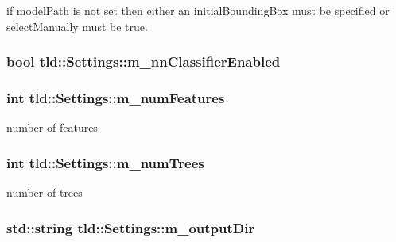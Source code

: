if modelPath is not set then either an initialBoundingBox must be specified or selectManually must be true. 

\hypertarget{classtld_1_1_settings_a8ec793b6668a626308d8ee8d697d9f67}{
\subsubsection[{m\_\-nnClassifierEnabled}]{\setlength{\rightskip}{0pt plus 5cm}bool {\bf tld::Settings::m\_\-nnClassifierEnabled}}}
\label{classtld_1_1_settings_a8ec793b6668a626308d8ee8d697d9f67}
\hypertarget{classtld_1_1_settings_af15afe9f4ffb32e89686c8e90026e2bc}{
\subsubsection[{m\_\-numFeatures}]{\setlength{\rightskip}{0pt plus 5cm}int {\bf tld::Settings::m\_\-numFeatures}}}
\label{classtld_1_1_settings_af15afe9f4ffb32e89686c8e90026e2bc}


number of features 

\hypertarget{classtld_1_1_settings_a959d793b002e13f6758fc84765b7d33d}{
\subsubsection[{m\_\-numTrees}]{\setlength{\rightskip}{0pt plus 5cm}int {\bf tld::Settings::m\_\-numTrees}}}
\label{classtld_1_1_settings_a959d793b002e13f6758fc84765b7d33d}


number of trees 

\hypertarget{classtld_1_1_settings_a8893600d99c4d096e384e4aeff2155f7}{
\subsubsection[{m\_\-outputDir}]{\setlength{\rightskip}{0pt plus 5cm}std::string {\bf tld::Settings::m\_\-outputDir}}}
\label{classtld_1_1_settings_a8893600d99c4d096e384e4aeff2155f7}



